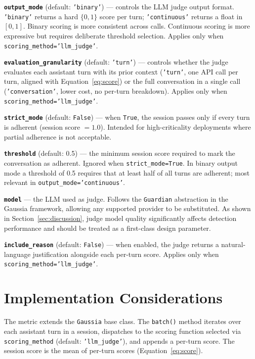 \documentclass[11pt,a4paper]{article}
\begin{document}
\textbf{\texttt{output\_mode}} (default: \texttt{'binary'}) --- controls
the LLM judge output format. \texttt{'binary'} returns a hard $\{0, 1\}$
score per turn; \texttt{'continuous'} returns a float in $[0, 1]$. Binary
scoring is more consistent across calls. Continuous scoring is more
expressive but requires deliberate threshold selection. Applies only when
\texttt{scoring\_method='llm\_judge'}.

\textbf{\texttt{evaluation\_granularity}} (default: \texttt{'turn'}) ---
controls whether the judge evaluates each assistant turn with its prior
context (\texttt{'turn'}, one API call per turn, aligned with
Equation~\ref{eq:score}) or the full conversation in a single call
(\texttt{'conversation'}, lower cost, no per-turn breakdown). Applies only
when \texttt{scoring\_method='llm\_judge'}.

\textbf{\texttt{strict\_mode}} (default: \texttt{False}) --- when
\texttt{True}, the session passes only if every turn is adherent (session
score $= 1.0$). Intended for high-criticality deployments where partial
adherence is not acceptable.

\textbf{\texttt{threshold}} (default: 0.5) --- the minimum session score
required to mark the conversation as adherent. Ignored when
\texttt{strict\_mode=True}. In binary output mode a threshold of 0.5
requires that at least half of all turns are adherent; most relevant in
\texttt{output\_mode='continuous'}.

\textbf{\texttt{model}} --- the LLM used as judge. Follows the
\texttt{Guardian} abstraction in the Gaussia framework, allowing any
supported provider to be substituted. As shown in Section~\ref{sec:discussion},
judge model quality significantly affects detection performance and should
be treated as a first-class design parameter.

\textbf{\texttt{include\_reason}} (default: \texttt{False}) --- when
enabled, the judge returns a natural-language justification alongside each
per-turn score. Applies only when \texttt{scoring\_method='llm\_judge'}.

\section{Implementation Considerations}

The metric extends the \texttt{Gaussia} base class. The \texttt{batch()}
method iterates over each assistant turn in a session, dispatches to the
scoring function selected via \texttt{scoring\_method} (default:
\texttt{'llm\_judge'}), and appends a per-turn score. The session score is
the mean of per-turn scores (Equation~\ref{eq:score}).
\end{document}
